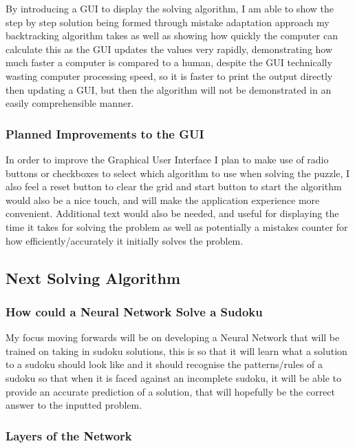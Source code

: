 \documentclass[]{final_report}
\begin{document}
By introducing a GUI to display the solving algorithm, I am able to show the step by step solution being formed through mistake adaptation approach my backtracking algorithm takes as well as showing how quickly the computer can calculate this as the GUI updates the values very rapidly, demonstrating how much faster a computer is compared to a human, despite the GUI technically wasting computer processing speed, so it is faster to print the output directly then updating a GUI, but then the algorithm will not be demonstrated in an easily comprehensible manner. 

\subsubsection{Planned Improvements to the GUI} 

In order to improve the Graphical User Interface I plan to make use of radio buttons or checkboxes to select which algorithm to use when solving the puzzle, I also feel a reset button to clear the grid and start button to start the algorithm would also be a nice touch, and will make the application experience more convenient. Additional text would also be needed, and useful for displaying the time it takes for solving the problem as well as potentially a mistakes counter for how efficiently/accurately it initially solves the problem. 

\subsection*{Next Solving Algorithm} 

\subsubsection{How could a Neural Network Solve a Sudoku} 

My focus moving forwards will be on developing a Neural Network that will be trained on taking in sudoku solutions, this is so that it will learn what a solution to a sudoku should look like and it should recognise the patterns/rules of a sudoku so that when it is faced against an incomplete sudoku, it will be able to provide an accurate prediction of a solution, that will hopefully be the correct answer to the inputted problem.

\subsubsection{Layers of the Network}
\end{document}

